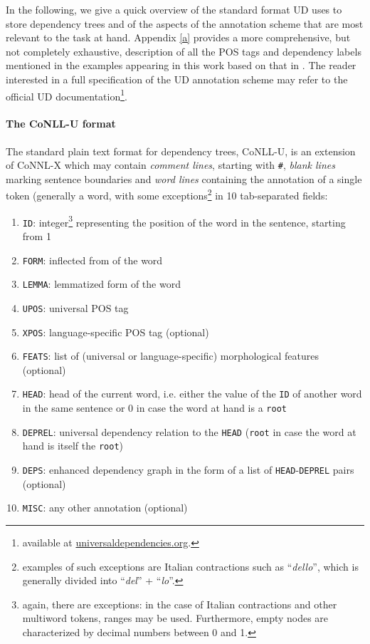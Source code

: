 In the following, we give a quick overview of the standard format UD uses to store dependency trees and of the aspects of the annotation scheme that are most relevant to the task at hand. 
Appendix \ref{a} provides a more comprehensive, but not completely exhaustive, description of all the POS tags and dependency labels mentioned in the examples appearing in this work based on that in \cite{compsyn}. 
The reader interested in a full specification of the UD annotation scheme may refer to the official UD documentation\footnote{available at \url{universaldependencies.org}.}. 

\paragraph{The CoNLL-U format} \label{conll}
The standard plain text format for dependency trees, CoNLL-U, is an extension of CoNNL-X \cite{conllx} which may contain \textit{comment lines}, starting with \texttt{\#}, \textit{blank lines} marking sentence boundaries and \textit{word lines} containing the annotation of a single token (generally a word, with some exceptions\footnote{examples of such exceptions are Italian contractions such as ``\textit{dello}'', which is generally divided into ``\textit{del}'' + ``\textit{lo}''.} in 10 tab-separated fields: \smallskip

\begin{enumerate}
    \item \texttt{ID}: integer\footnote{again, there are exceptions: in the case of Italian contractions and other multiword tokens, ranges may be used. Furthermore, empty nodes are characterized by decimal numbers between 0 and 1.} representing the position of the word in the sentence, starting from 1
    \item \texttt{FORM}: inflected from of the word
    \item \texttt{LEMMA}: lemmatized form of the word
    \item \texttt{UPOS}: universal POS tag
    \item \texttt{XPOS}: language-specific POS tag (optional)
    \item \texttt{FEATS}: list of (universal or language-specific) morphological features (optional)
    \item \texttt{HEAD}: head of the current word, i.e. either the value of the \texttt{ID} of another word in the same sentence or 0 in case the word at hand is a \texttt{root}
    \item \texttt{DEPREL}: universal dependency relation to the \texttt{HEAD} (\texttt{root} in case the word at hand is itself the \texttt{root})
    \item \texttt{DEPS}: enhanced dependency graph in the form of a list of \texttt{HEAD}-\texttt{DEPREL} pairs (optional)
    \item \texttt{MISC}: any other annotation (optional)
\end{enumerate} \smallskip

